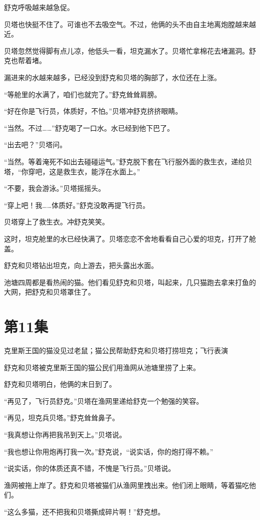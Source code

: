 \documentclass[a4paper,12pt,UTF8,twoside]{ctexbook}
\begin{document}
舒克呼吸越来越急促。

贝塔也快挺不住了。可谁也不去吸空气。不过，他俩的头不由自主地离炮膛越来越近。

贝塔忽然觉得脚有点儿凉，他低头一看，坦克漏水了。贝塔忙拿棉花去堵漏洞。舒克也帮着堵。

漏进来的水越来越多，已经没到舒克和贝塔的胸部了，水位还在上涨。

“等舱里的水满了，咱们也就完了。”舒克耸耸肩膀。

“好在你是飞行员，体质好，不怕。”贝塔冲舒克挤挤眼睛。

“当然。不过……”舒克喝了一口水。水已经到他下巴了。

“出去吧？”贝塔问。

“当然。等着淹死不如出去碰碰运气。”舒克脱下套在飞行服外面的救生衣，递给贝塔，“你穿吧，这是救生衣，能浮在水面上。”

“不要，我会游泳。”贝塔摇摇头。

“穿上吧！我……体质好。”舒克没敢再提飞行员。

贝塔穿上了救生衣。冲舒克笑笑。

这时，坦克舱里的水已经快满了。贝塔恋恋不舍地看看自己心爱的坦克，打开了舱盖。

舒克和贝塔钻出坦克，向上游去，把头露出水面。

池塘四周都是看热闹的猫。他们看见舒克和贝塔，叫起来，几只猫跑去拿来打鱼的大网，把舒克和贝塔罩住了。

\chapter{第11集}

克里斯王国的猫没见过老鼠；猫公民帮助舒克和贝塔打捞坦克；飞行表演

舒克和贝塔被克里斯王国的猫公民们用渔网从池塘里捞了上来。

舒克和贝塔明白，他俩的末日到了。

“再见了，飞行员舒克。”贝塔在渔网里递给舒克一个勉强的笑容。

“再见，坦克兵贝塔。”舒克耸耸鼻子。

“我真想让你再把我吊到天上。”贝塔说。

“我也想让你用炮再打我一次。”舒克说，“说实话，你的炮打得不赖。”

“说实话，你的体质还真不错，不愧是飞行员。”贝塔说。

渔网被拖上岸了。舒克和贝塔被猫们从渔网里拽出来。他们闭上眼睛，等着猫吃他们。

“这么多猫，还不把我和贝塔撕成碎片啊！”舒克想。
\end{document}
